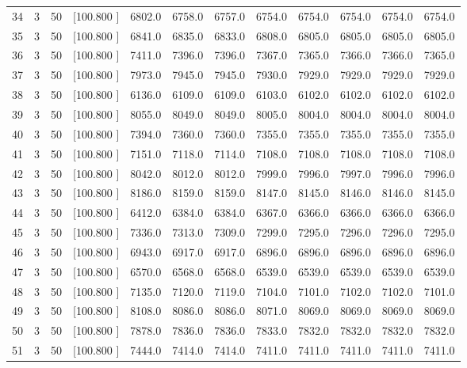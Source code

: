 \documentclass[12pt,a4paper]{article}
\begin{document}
\begin{center}
{\begin{tabular}{r r r r r r r r r r r r}
  34&  3& 50&[100.800   ]&  6802.0&  6758.0&  6757.0&  6754.0&  6754.0&  6754.0&  6754.0&  6754.0\\[-0.02in]
  35&  3& 50&[100.800   ]&  6841.0&  6835.0&  6833.0&  6808.0&  6805.0&  6805.0&  6805.0&  6805.0\\[-0.02in]
  36&  3& 50&[100.800   ]&  7411.0&  7396.0&  7396.0&  7367.0&  7365.0&  7366.0&  7366.0&  7365.0\\[-0.02in]
  37&  3& 50&[100.800   ]&  7973.0&  7945.0&  7945.0&  7930.0&  7929.0&  7929.0&  7929.0&  7929.0\\[-0.02in]
  38&  3& 50&[100.800   ]&  6136.0&  6109.0&  6109.0&  6103.0&  6102.0&  6102.0&  6102.0&  6102.0\\[-0.02in]
  39&  3& 50&[100.800   ]&  8055.0&  8049.0&  8049.0&  8005.0&  8004.0&  8004.0&  8004.0&  8004.0\\[-0.02in]
  40&  3& 50&[100.800   ]&  7394.0&  7360.0&  7360.0&  7355.0&  7355.0&  7355.0&  7355.0&  7355.0\\[-0.02in]
  41&  3& 50&[100.800   ]&  7151.0&  7118.0&  7114.0&  7108.0&  7108.0&  7108.0&  7108.0&  7108.0\\[-0.02in]
  42&  3& 50&[100.800   ]&  8042.0&  8012.0&  8012.0&  7999.0&  7996.0&  7997.0&  7996.0&  7996.0\\[-0.02in]
  43&  3& 50&[100.800   ]&  8186.0&  8159.0&  8159.0&  8147.0&  8145.0&  8146.0&  8146.0&  8145.0\\[-0.02in]
  44&  3& 50&[100.800   ]&  6412.0&  6384.0&  6384.0&  6367.0&  6366.0&  6366.0&  6366.0&  6366.0\\[-0.02in]
  45&  3& 50&[100.800   ]&  7336.0&  7313.0&  7309.0&  7299.0&  7295.0&  7296.0&  7296.0&  7295.0\\[-0.02in]
  46&  3& 50&[100.800   ]&  6943.0&  6917.0&  6917.0&  6896.0&  6896.0&  6896.0&  6896.0&  6896.0\\[-0.02in]
  47&  3& 50&[100.800   ]&  6570.0&  6568.0&  6568.0&  6539.0&  6539.0&  6539.0&  6539.0&  6539.0\\[-0.02in]
  48&  3& 50&[100.800   ]&  7135.0&  7120.0&  7119.0&  7104.0&  7101.0&  7102.0&  7102.0&  7101.0\\[-0.02in]
  49&  3& 50&[100.800   ]&  8108.0&  8086.0&  8086.0&  8071.0&  8069.0&  8069.0&  8069.0&  8069.0\\[-0.02in]
  50&  3& 50&[100.800   ]&  7878.0&  7836.0&  7836.0&  7833.0&  7832.0&  7832.0&  7832.0&  7832.0\\[-0.02in]
  51&  3& 50&[100.800   ]&  7444.0&  7414.0&  7414.0&  7411.0&  7411.0&  7411.0&  7411.0&  7411.0\\[-0.02in]

\end{tabular}}
\end{center}
\end{document}
